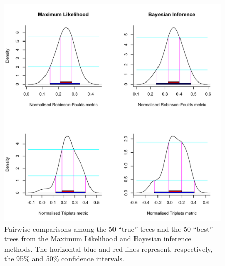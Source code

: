 \begin{figure}%
\centering
    \includegraphics[width=1\textwidth]{Supplementaries/Figures/TEM/True_vs_Best_trees.pdf}
    \caption[Comparison between the ``true'' and the ``best'' trees]{Pairwise comparisons among the 50 ``true'' trees and the 50 ``best'' trees from the Maximum Likelihood and Bayesian inference methods. The horizontal blue and red lines represent, respectively, the 95\% and 50\% confidence intervals.} 
\label{Fig_Supp_True_Best} 
\end{figure}

